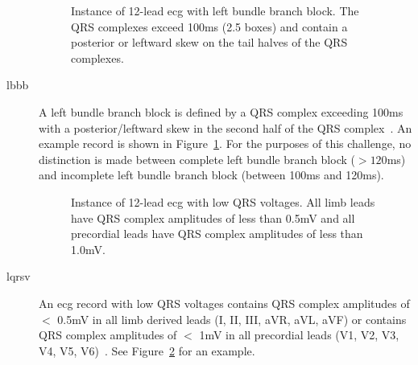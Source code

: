\documentclass[\main/thesis.tex]{subfiles}
\begin{document}
\begin{description}
    \begin{figure}[H]
        \centering
        \caption{Instance of 12-lead \gls{ecg} with left bundle branch block. The QRS complexes exceed 100ms (2.5 boxes) and contain a posterior or leftward skew on the tail halves of the QRS complexes.}
        \label{fig:full_LBBB}
    \end{figure}
    \item[\gls{lbbb}] A left bundle branch block is defined by a QRS complex exceeding 100ms with a posterior/leftward skew in the second half of the QRS complex~\cite{ecg-utah-lesson}. An example record is shown in Figure~\ref{fig:full_LBBB}. For the purposes of this challenge, no distinction is made between complete left bundle branch block ($> 120$ms) and incomplete left bundle branch block (between 100ms and 120ms).

    \begin{figure}[H]
        \centering
        \caption{Instance of 12-lead \gls{ecg} with low QRS voltages. All limb leads have QRS complex amplitudes of less than 0.5mV and all precordial leads have QRS complex amplitudes of less than 1.0mV.}
        \label{fig:full_LQRSV}
    \end{figure}
    \item[\gls{lqrsv}] An \gls{ecg} record with low QRS voltages contains QRS complex amplitudes of $<$ 0.5mV in all limb derived leads (I, II, III, aVR, aVL, aVF) or contains QRS complex amplitudes of $<$ 1mV in all precordial leads (V1, V2, V3, V4, V5, V6)~\cite{madias_low_2008}. See Figure~\ref{fig:full_LQRSV} for an example.


\end{description}
\end{document}
